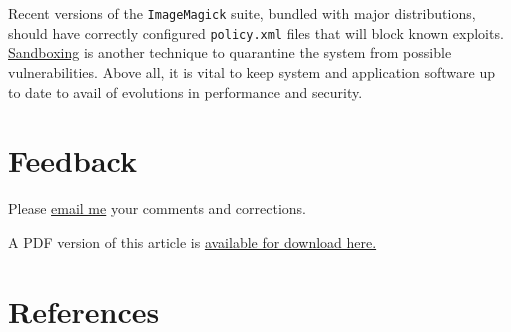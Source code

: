 \documentclass[
  11pt,
  british,
  a4paper,
]{article}
\begin{document}
Recent versions of the \texttt{ImageMagick} suite, bundled with major
distributions, should have correctly configured \texttt{policy.xml}
files that will block known exploits.
\href{https://www.techopedia.com/definition/25266/sandboxing}{Sandboxing}
is another technique to quarantine the system from possible
vulnerabilities. Above all, it is vital to keep system and application
software up to date to avail of evolutions in performance and security.

\hypertarget{feedback}{%
\section{Feedback}\label{feedback}}

Please \href{mailto:feedback.swanlotus@gmail.com}{email me} your
comments and corrections.

\noindent A PDF version of this article is
\href{image-format-conversions.pdf}{available for download here.}

\hypertarget{bibliography}{%
\section*{References}\label{bibliography}}
\end{document}

